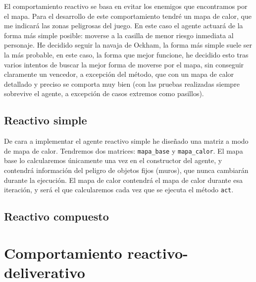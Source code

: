 \documentclass[10pt, spanish]{article}
\begin{document}
El comportamiento reactivo se basa en evitar los enemigos que encontramos por el mapa. Para el desarrollo de este comportamiento tendré un mapa de calor, que me indicará las zonas peligrosas del juego. En este caso el agente actuará de la forma más simple posible: moverse a la casilla de menor riesgo inmediata al personaje. He decidido seguir la navaja de Ockham, la forma más simple suele ser la más probable, en este caso, la forma que mejor funcione, he decidido esto tras varios intentos de buscar la mejor forma de moverse por el mapa, sin conseguir claramente un vencedor, a excepción del método, que con un mapa de calor detallado y preciso se comporta muy bien (con las pruebas realizadas siempre sobrevive el agente, a excepción de casos extremos como pasillos).

\subsection{Reactivo simple}

De cara a implementar el agente reactivo simple he diseñado una matriz a modo de mapa de calor. Tendremos dos matrices: \texttt{mapa\_base} y \texttt{mapa\_calor}. El mapa base lo calcularemos únicamente una vez en el constructor del agente, y contendrá información del peligro de objetos fijos (muros), que nunca cambiarán durante la ejecución. El mapa de calor contendrá el mapa de calor durante esa iteración, y será el que calcularemos cada vez que se ejecuta el método \texttt{act}.

\subsection{Reactivo compuesto}

\section{Comportamiento reactivo-deliverativo}
\end{document}
